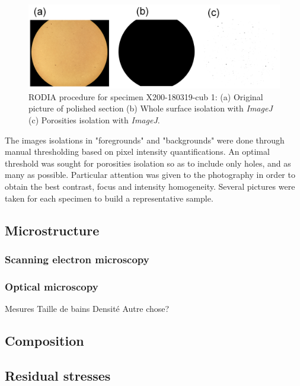 \begin{figure}[ht]
\centering
\centerline{\includegraphics[scale=0.29]{Images/ImageJ-cub1}}
\decoRule
\caption[RODIA procedure for specimen X200-180319-cub 1: (a) Original picture of polished section (b) Whole surface isolation with \textit{ImageJ} (c) Porosities isolation with \textit{ImageJ}.]{RODIA procedure for specimen X200-180319-cub 1: (a) Original picture of polished section (b) Whole surface isolation with \textit{ImageJ} (c) Porosities isolation with \textit{ImageJ}.}
\label{fig:ImageJ}
\end{figure}

The images isolations in "foregrounds" and "backgrounds" were done through manual thresholding based on pixel intensity quantifications.  %
An optimal threshold was sought for porosities isolation so as to include only holes, and as many as possible. Particular attention was given to the photography in order to obtain the best contrast, focus and intensity homogeneity. Several pictures were taken for each specimen to build a representative sample.

\subsection{Microstructure}

\subsubsection{Scanning electron microscopy}

\subsubsection{Optical microscopy}
Mesures Taille de bains
Densité
Autre chose?
\subsection{Composition}

\subsection{Residual stresses}

